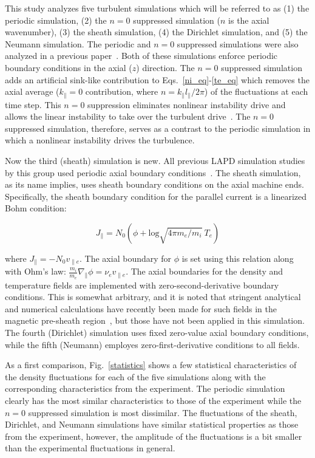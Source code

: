 \documentclass[showpacs,preprintnumbers,amsmath,amssymb,superscriptaddress,aip]{revtex4-1}
\def\beq{\begin{equation}}
\def\eeq{\end{equation}}
\def\para{\parallel}
\def\grad{\nabla}
\newcommand{\gradpar}{\grad_\parallel}
\newcommand{\vpe}{v_{\parallel e}}
\newcommand{\nue}{\nu_{e}}
\newcommand{\fmie}{\frac{m_i}{m_e}}
\begin{document}
This study analyzes five turbulent simulations which will be referred to as (1) the periodic simulation, (2) the $n=0$ suppressed simulation ($n$ is the axial wavenumber), 
(3) the sheath simulation, (4) the Dirichlet simulation,
and (5) the Neumann simulation.
The periodic and $n=0$ suppressed simulations were also analyzed in a previous paper~\cite{friedman2012b}. Both of these simulations enforce periodic boundary conditions in the axial ($z$)
direction. The $n=0$ suppressed simulation adds an artificial sink-like contribution to Eqs.~\ref{ni_eq}-\ref{te_eq} which removes the axial average 
($k_\parallel = 0$ contribution, where $n = k_\para l_\para /2 \pi$) of the fluctuations at each time step. This $n=0$ suppression eliminates nonlinear instability drive and allows
the linear instability to take over the turbulent drive~\cite{friedman2012b}. The $n=0$ suppressed simulation, therefore, serves as a contrast to the periodic simulation in which a nonlinear instability
drives the turbulence.

Now the third (sheath) simulation is new. 
All previous LAPD simulation studies by this group used periodic axial boundary conditions~\cite{Popovich2010a,Popovich2010b,Umansky2011,friedman2012,friedman2012b}.
The sheath simulation, as its name implies, uses sheath boundary conditions on the axial machine ends. Specifically, the sheath boundary
condition for the parallel current is a linearized Bohm condition:

\beq
\label{sheath_bndry}
J_\para = N_0 (\phi + \text{log} \sqrt{4 \pi m_e/m_i} \ T_e) 
\eeq

where $J_\para = - N_0 \vpe$. The axial boundary for $\phi$ is set using this relation along with Ohm's law: $ \fmie \gradpar \phi = \nue \vpe$. 
The axial boundaries for the density and temperature fields are implemented with zero-second-derivative boundary conditions. This is somewhat arbitrary, and it is noted
that stringent analytical and numerical calculations have recently been made for such fields in the magnetic pre-sheath region~\cite{loizu2012}, but those have not been applied in this simulation.
The fourth (Dirichlet) simulation uses fixed zero-value axial boundary conditions, while the fifth (Neumann) employes zero-first-derivative conditions to all fields.

As a first comparison, Fig.~\ref{statistics} shows a few statistical characteristics of the density fluctuations for each of the five simulations along with the corresponding
characteristics from the experiment. The periodic simulation clearly has the most similar characteristics to those of the experiment while the $n=0$ suppressed simulation is most dissimilar.
The fluctuations of the sheath, Dirichlet, and Neumann simulations have similar statistical properties as those from the experiment, however, 
the amplitude of the fluctuations is a bit smaller than the experimental fluctuations in general.
\end{document}
